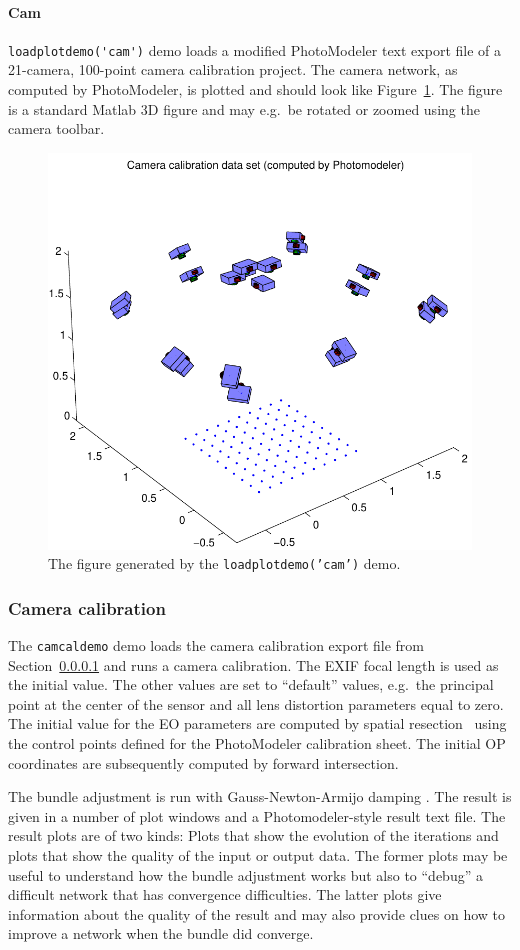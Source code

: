 \documentclass{article}
\begin{document}
\paragraph{\sc Cam}
\label{sec:camcaldata}
\verb+loadplotdemo('cam')+ demo loads a modified PhotoModeler text
export file of a 21-camera, 100-point camera calibration project. The
camera network, as computed by PhotoModeler, is plotted and should
look like Figure~\ref{fig:camcalib}. The figure is a standard Matlab
3D figure and may e.g.\ be rotated or zoomed using the camera toolbar.

\begin{figure}
  \centering
  \includegraphics[width=0.45\hsize]{ill/ccam}
  \caption{The figure generated by the \texttt{loadplotdemo('cam')} demo.}
  \label{fig:camcalib}
\end{figure}

\subsubsection{Camera calibration}

The \verb+camcaldemo+ demo loads the camera calibration export file
from Section~\ref{sec:camcaldata} and runs a camera calibration. The
EXIF focal length is used as the initial value. The other values are
set to ``default'' values, e.g.\ the principal point at the center of
the sensor and all lens distortion parameters equal to zero. The
initial value for the EO parameters are computed by spatial
resection~\citep[Chap.~11.1.3.4]{Haralick1994:Review,McGlone2004:Manual} using
the control points defined for the PhotoModeler calibration sheet. The
initial OP coordinates are subsequently computed by forward
intersection.

The bundle adjustment is run with Gauss-Newton-Armijo damping
\citep{Borlin2013:Bundle}. The result is given in a number of plot
windows and a Photo\-modeler-style result text file. The result plots
are of two kinds: Plots that show the evolution of the iterations and
plots that show the quality of the input or output data. The former
plots may be useful to understand how the bundle adjustment works but
also to ``debug'' a difficult network that has convergence
difficulties. The latter plots give information about the quality of
the result and may also provide clues on how to improve a network when
the bundle did converge.
\end{document}
